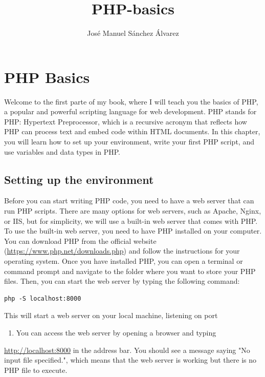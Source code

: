 \documentclass[11pt]{article}
\author{José Manuel Sánchez Álvarez}
\date{}
\title{PHP-basics}
\begin{document}
\maketitle
\setcounter{tocdepth}{3}
\tableofcontents

\setlength\parindent{10pt}

\section{PHP Basics}
\label{sec:org686c6b6}
Welcome to the first parte of my book, where I will teach you the basics
of PHP, a popular and powerful scripting language for web development.
PHP stands for PHP: Hypertext Preprocessor, which is a recursive acronym
that reflects how PHP can process text and embed code within HTML
documents. In this chapter, you will learn how to set up your
environment, write your first PHP script, and use variables and data
types in PHP.

\subsection{Setting up the environment}
\label{sec:orgf77d4e1}
Before you can start writing PHP code, you need to have a web server
that can run PHP scripts. There are many options for web servers, such
as Apache, Nginx, or IIS, but for simplicity, we will use a built-in web
server that comes with PHP. To use the built-in web server, you need to
have PHP installed on your computer. You can download PHP from the
official website (\url{https://www.php.net/downloads.php}) and follow the
instructions for your operating system. Once you have installed PHP, you
can open a terminal or command prompt and navigate to the folder where
you want to store your PHP files. Then, you can start the web server by
typing the following command:

\begin{verbatim}
php -S localhost:8000
\end{verbatim}

This will start a web server on your local machine, listening on port
\begin{enumerate}
\item You can access the web server by opening a browser and typing
\end{enumerate}
\url{http://localhost:8000} in the address bar. You should see a message
saying "No input file specified.", which means that the web server is
working but there is no PHP file to execute.
\end{document}
